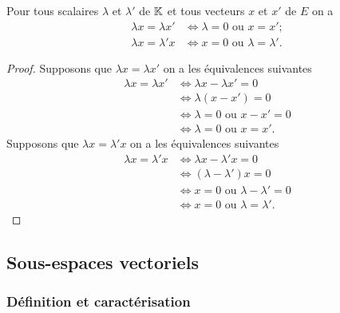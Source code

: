 \begin{prop}
  Pour tous scalaires \(\lambda\) et \(\lambda'\) de \(\mathbb{K}\) et tous vecteurs \(x\) et \(x'\) de \(E\) on a
  \begin{align}
    \lambda x = \lambda x' &\iff \lambda=0 \text{~ou~} x=x'; \\
    \lambda x = \lambda' x &\iff x=0 \text{~ou~} \lambda=\lambda'.
  \end{align}
\end{prop}
\begin{proof}
  Supposons que \(\lambda x=\lambda x'\) on a les équivalences suivantes
  \begin{align}
    \lambda x=\lambda x' &\iff \lambda x-\lambda x' = 0\\
    &\iff \lambda(x-x')=0\\
    &\iff \lambda = 0 \text{~ou~} x-x'=0\\
    &\iff \lambda = 0 \text{~ou~} x=x'.
  \end{align}
  Supposons que \(\lambda x=\lambda' x\) on a les équivalences suivantes
  \begin{align}
    \lambda x=\lambda' x &\iff \lambda x-\lambda' x= 0\\
    &\iff (\lambda-\lambda')x=0\\
    &\iff x = 0 \text{~ou~} \lambda-\lambda'=0\\
    &\iff x = 0 \text{~ou~} \lambda=\lambda'.
  \end{align}
\end{proof}

\subsection{Sous-espaces vectoriels}

\subsubsection{Définition et caractérisation}

